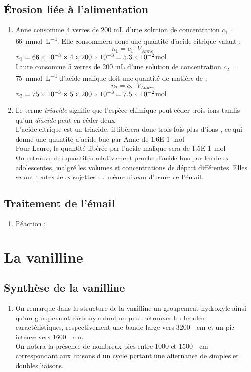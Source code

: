 \documentclass[a4paper,11pt,fleqn]{article}%
\begin{document}
	\subsection{Érosion liée à l'alimentation}
	\begin{enumerate}[resume]
		\item Anne consomme 4 verres de 200 mL d'une solution de concentration $c_1$ = \SI{66}{\milli\mole\per\liter}. Elle consommera donc une quantité d'acide citrique valant : $$n_1 = c_1 \cdot V_{Anne}$$
		\noindent {} $n_1 = \num{66E-3} \times 4\times \num{200E-3} = \SI{5.3E-2}{\mole}$\\
		Laure consomme 5 verres de 200 mL d'une solution de concentration $c_2$ = \SI{75}{\milli\mole\per\liter} d'acide malique doit une quantité de matière de :  $$n_2 = c_2 \cdot V_{Laure}$$
		\noindent {} $n_2 = \num{75E-3} \times 5\times \num{200E-3} = \SI{7.5E-2}{\mole}$\\
		\item Le terme \emph{triacide} signifie que l'espèce chimique peut céder trois ions  tandis qu'un \emph{diacide} peut en céder deux.\\
		L'acide citrique est un triacide, il libèrera donc trois fois plus d'ions , ce qui donne une quantité d'acide bue par Anne de \SI{1.6E-1}{\mole}\\
		Pour Laure, la quantité libérée par l'acide malique sera de  \SI{1.5E-1}{\mole}\\
		On retrouve des quantités relativement proche d'acide bus par les deux adolescentes, malgré les volumes et concentrations de départ différentes. Elles seront toutes deux sujettes au même niveau d'usure de l'émail.
	\end{enumerate}
	
	\subsection{Traitement de l'émail}
	\begin{enumerate}[resume]
		\item Réaction : 
	\end{enumerate}
	
\section{La vanilline}
	\subsection{Synthèse de la vanilline}
	\begin{enumerate}
		\item On remarque dans la structure de la vanilline un groupement hydroxyle ainsi qu'un groupement carbonyle dont on peut retrouver les bandes caractéristiques, respectivement une bande large vers \SI{3200}{\per\centi\meter} et un pic intense vers \SI{1600}{\per\centi\meter}.\\ On notera la présence de nombreux pics entre \num{1000} et \SI{1500}{\per\centi\meter} correspondant aux liaisons d'un cycle portant une alternance de simples et doubles liaisons.
	\end{enumerate}
	
\end{document}
